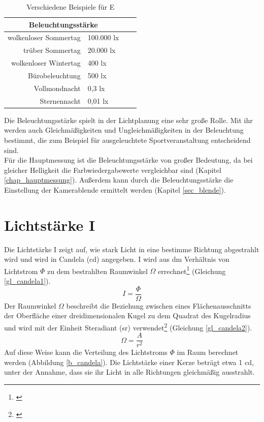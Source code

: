 \begin{table}[htp] 
		\centering
		\begin{tabular}{rlcc}  %
		\toprule
		\multicolumn{2}{c}{\large\sffamily Beleuchtungsstärke}\\ 							
		\midrule
		wolkenloser Sommertag & 100.000 lx\\
		trüber Sommertag & 20.000 lx\\
		wolkenloser Wintertag & 400 lx\\
		Bürobeleuchtung & 500 lx\\
		Vollmondnacht & 0,3 lx\\
		Sternennacht & 0,01 lx\\
		\bottomrule
		\end{tabular}
		\caption{Verschiedene Beispiele für E\protect\footnotemark}	
		\label{t_lux}
	\end{table}
\noindent Die Beleuchtungsstärke spielt in der Lichtplanung eine sehr große Rolle. Mit ihr werden auch Gleichmäßigkeiten und Ungleichmäßigkeiten in der Beleuchtung bestimmt, die zum Beispiel für ausgeleuchtete Sportveranstaltung entscheidend sind.\\
Für die Hauptmessung ist die Beleuchtungsstärke von großer Bedeutung, da bei gleicher Helligkeit die Farbwiedergabewerte vergleichbar sind (Kapitel \ref{chap_hauptmessung}). Außerdem kann durch die Beleuchtungsstärke die Einstellung der Kamerablende ermittelt werden (Kapitel \ref{sec_blende}).

\section{Lichtstärke I}\label{sec_candela}
Die Lichtstärke I zeigt auf, wie stark Licht in eine bestimme Richtung abgestrahlt wird und wird in Candela (cd) angegeben. I wird aus dm Verhältnis von Lichtstrom $\Phi$ zu dem bestrahlten Raumwinkel $\Omega$ errechnet\footnote{\cite[27]{ris}} (Gleichung \ref{gl_candela1}).
 \begin{equation}\label{gl_candela1}
	I=\frac{\Phi}{\Omega}	
\end{equation}
Der Raumwinkel $\Omega$ beschreibt die Beziehung zwischen eines Flächenausschnitts der Oberfläche einer dreidimensionalen Kugel zu dem Quadrat des Kugelradius und wird mit der Einheit Steradiant (sr) verwendet\footnote{\cite[26]{ris}}  (Gleichung \ref{gl_candela2}).
 \begin{equation}\label{gl_candela2}
	\Omega=\frac{A}{r^{2}}	
\end{equation}
Auf diese Weise kann die Verteilung des Lichtstroms $\Phi$ im Raum berechnet werden (Abbildung \ref{b_candela}). Die Lichtstärke einer Kerze beträgt etwa 1 cd, unter der Annahme, dass sie ihr Licht in alle Richtungen gleichmäßig ausstrahlt.


